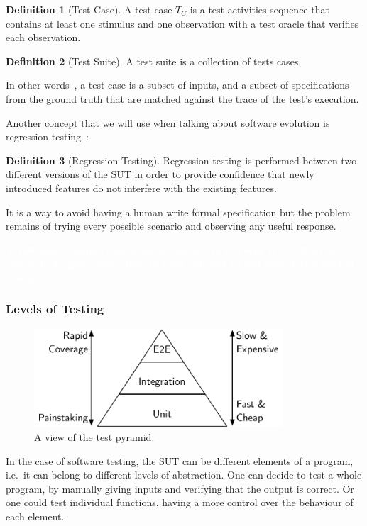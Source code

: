 \documentclass[a4paper,11pt]{sdm_internship}
\newcommand{\todo}[1]{\colorbox{Red!75}{\textcolor{white}{\textbf{TODO\ifx&#1&\else: #1\fi}}}}
\theoremstyle{definition}
\newtheorem{definition}{Definition}[section]
\begin{document}
\begin{definition}[Test Case]
  A test case $T_C$ is a test activities sequence that contains at least one stimulus and one observation with a test oracle that verifies each observation.
\end{definition}
\begin{definition}[Test Suite]
  A test suite is a collection of tests cases.
\end{definition}

In other words~\cite{bernot1991software}, a test case is a subset of inputs, and a subset of specifications from the ground truth that are matched against the trace of the test's execution.

Another concept that we will use when talking about software evolution is regression testing~\cite{yoo2012regression}:

\begin{definition}[Regression Testing]
  Regression testing is performed between two different versions of the SUT in order to provide confidence that newly introduced features do not interfere with the existing features.
\end{definition}

It is a way to avoid having a human write formal specification but the problem remains of trying every possible scenario and observing any useful response.

\todo{give some clues to each concept to tell why it is a field of research?}

\subsubsection{Levels of Testing}%
\label{sssec:levels_testing}
\begin{figure}
  \centering
  \includegraphics[width=25em]{test_pyramid}
  \caption{A view of the test pyramid.}%
  \label{fig:test_pyramid}
\end{figure}

In the case of software testing, the SUT can be different elements of a program, i.e.\ it can belong to different levels of abstraction.
One can decide to test a whole program, by manually giving inputs and verifying that the output is correct.
Or one could test individual functions, having a more control over the behaviour of each element.
\end{document}
